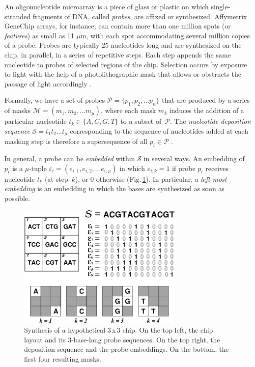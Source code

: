\documentclass{llncs}
\begin{document}
An oligonucleotide microarray is a piece of glass or plastic on which
single-stranded fragments of DNA, called \emph{probes}, are affixed or
synthesized. Affymetrix GeneChip\raisebox{.6ex}{\scriptsize \textregistered}
arrays, for instance, can contain
more than one million spots (or \emph{features}) as small as 11 $\mu$m,
with each spot accommodating several million copies of a probe. Probes
are typically 25 nucleotides long and are synthesized on the chip, in parallel,
in a series of repetitive steps. Each step appends the same
nucleotide to probes of selected regions of the chip. Selection occurs
by exposure to light with the help of a photolithographic mask that
allows or obstructs the passage of light accordingly \cite{FODOR91}.

Formally, we have a set of probes $\mathcal{P} = \{p_{1}, p_{2}, ... p_{n}\}$
that are produced by a series of masks $\mathcal{M} = (m_{1}, m_{2}, ... m_{\mu})$,
where each mask $m_{k}$ induces the addition of a particular nucleotide
$t_{k} \in \{A, C, G, T\}$ to a subset of~$\mathcal{P}$. The \emph{nucleotide
deposition sequence} $\mathcal{S} = t_{1} t_{2} \ldots t_{\mu}$ corresponding
to the sequence of nucleotides added at each masking step is therefore a
supersequence of all $p_{i} \in \mathcal{P}$ \cite{RAHMANN03}.

In general, a probe can be \emph{embedded} within $\mathcal{S}$ in several
ways. An embedding of $p_{i}$ is a $\mu$-tuple
$\varepsilon_{i} = (e_{i,1}, e_{i,2}, ... e_{i,\mu})$ in which $e_{i,k} = 1$
if probe $p_{i}$ receives nucleotide $t_{k}$ (at step~$k$), or 0 otherwise
(Fig.\,\ref{fig:masking_process}). In particular, a \emph{left-most embedding}
is an embedding in which the bases are synthesized as soon as possible.

\begin{figure}
\centerline{\includegraphics[width=230pt]{chip}}
\caption{Synthesis of a hypothetical 3\,x\,3 chip. On the top left, the chip
layout and its 3-base-long probe sequences. On the top right, the deposition
sequence and the probe embeddings. On the bottom, the first four resulting masks.}
\label{fig:masking_process}
\end{figure}
\end{document}
